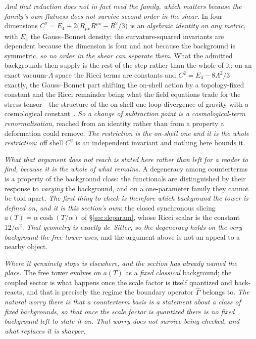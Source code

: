 \documentclass[11pt,a4paper]{article}
\theoremstyle{plain}
\theoremstyle{definition}
\theoremstyle{remark}
\begin{document}
\emph{And that reduction does not in fact need the family, which matters because the family's own
flatness does not survive second order in the shear.} In four dimensions
$C^{2}=E_{4}+2\bigl(R_{\mu\nu}R^{\mu\nu}-R^{2}/3\bigr)$ is an \emph{algebraic identity on any
metric}, with $E_{4}$ the Gauss--Bonnet density: the curvature-squared invariants are dependent
because the dimension is four and not because the background is symmetric, \emph{so no order in the
shear can separate them}. What the admitted backgrounds then supply is the rest of the step rather
than the whole of it: on an exact vacuum-$\Lambda$ space the Ricci terms are constants and
$C^{2}=E_{4}-8\Lambda^{2}/3$ exactly, the Gauss--Bonnet part shifting the on-shell action by a
topology-fixed constant and the Ricci remainder being what the field equations trade for the stress
tensor---the structure of the on-shell one-loop divergence of gravity with a cosmological
constant~\cite{tHooftVeltman1974, ChristensenDuff1980}. \emph{So a change of subtraction point is a cosmological-term renormalisation}, reached from
an identity rather than from a property a deformation could remove.
\emph{The restriction is the on-shell one and it is the whole restriction}: off shell $C^{2}$ is an
independent invariant and nothing here bounds it.

\emph{What that argument does not reach is stated here rather than left for a reader to find, because
it is the whole of what remains.} A degeneracy among counterterms is a property of the background
class: the functionals are distinguished by their response to \emph{varying} the background, and on a
one-parameter family they cannot be told apart. \emph{The first thing to check is therefore which
background the tower is defined on, and it is this section's own}: the closed synchronous slicing
$a(T)=\alpha\cosh(T/\alpha)$ of \S\ref{sec:deparam}, whose Ricci scalar is the constant $12/\alpha^{2}$.
\emph{That geometry is exactly de~Sitter, so the degeneracy holds on the very background the free tower
uses}, and the argument above is not an appeal to a nearby object.

\emph{Where it genuinely stops is elsewhere, and the section has already named the place.} The free
tower evolves on $a(T)$ as a \emph{fixed classical} background; the coupled sector is what happens once
the scale factor is itself quantized and back-reacts, and that is precisely the regime the boundary
operator $\hat\Gamma$ belongs to. \emph{The natural worry there is that a counterterm basis is a
statement about a class of fixed backgrounds, so that once the scale factor is quantized there is no
fixed background left to state it on. That worry does not survive being checked, and what replaces it
is sharper.} 
\end{document}
